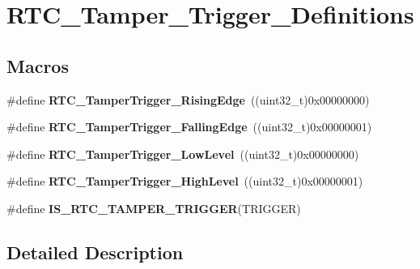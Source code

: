 \hypertarget{group___r_t_c___tamper___trigger___definitions}{}\section{R\+T\+C\+\_\+\+Tamper\+\_\+\+Trigger\+\_\+\+Definitions}
\label{group___r_t_c___tamper___trigger___definitions}
\subsection*{Macros}
\begin{DoxyCompactItemize}
\item 
\hypertarget{group___r_t_c___tamper___trigger___definitions_ga92ced18ec15722a30334a4df73ab046e}{}\#define {\bfseries R\+T\+C\+\_\+\+Tamper\+Trigger\+\_\+\+Rising\+Edge}~((uint32\+\_\+t)0x00000000)\label{group___r_t_c___tamper___trigger___definitions_ga92ced18ec15722a30334a4df73ab046e}

\item 
\hypertarget{group___r_t_c___tamper___trigger___definitions_ga9c78b3d15d85c5bd32c3003effe84b3d}{}\#define {\bfseries R\+T\+C\+\_\+\+Tamper\+Trigger\+\_\+\+Falling\+Edge}~((uint32\+\_\+t)0x00000001)\label{group___r_t_c___tamper___trigger___definitions_ga9c78b3d15d85c5bd32c3003effe84b3d}

\item 
\hypertarget{group___r_t_c___tamper___trigger___definitions_ga823f204682b5fab1d5b8aa053c53f97d}{}\#define {\bfseries R\+T\+C\+\_\+\+Tamper\+Trigger\+\_\+\+Low\+Level}~((uint32\+\_\+t)0x00000000)\label{group___r_t_c___tamper___trigger___definitions_ga823f204682b5fab1d5b8aa053c53f97d}

\item 
\hypertarget{group___r_t_c___tamper___trigger___definitions_gac7d32f8fc0730428bbeaa1927fb36d01}{}\#define {\bfseries R\+T\+C\+\_\+\+Tamper\+Trigger\+\_\+\+High\+Level}~((uint32\+\_\+t)0x00000001)\label{group___r_t_c___tamper___trigger___definitions_gac7d32f8fc0730428bbeaa1927fb36d01}

\item 
\#define {\bfseries I\+S\+\_\+\+R\+T\+C\+\_\+\+T\+A\+M\+P\+E\+R\+\_\+\+T\+R\+I\+G\+G\+E\+R}(T\+R\+I\+G\+G\+E\+R)
\end{DoxyCompactItemize}


\subsection{Detailed Description}


